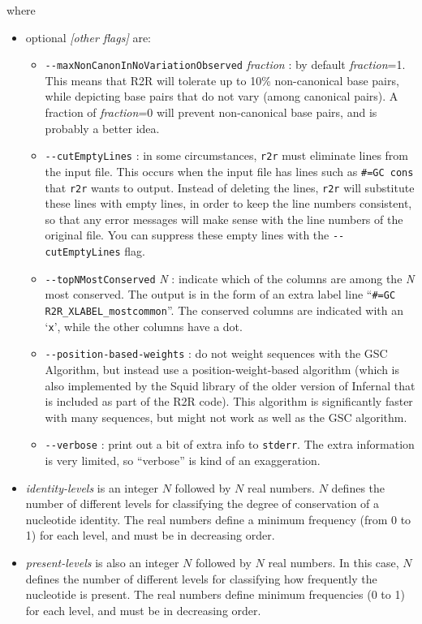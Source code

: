 \documentclass[letterpaper,12pt]{report}
\begin{document}
where
\begin{itemize}
\item optional {\it{} [other flags]} are:
  \begin{itemize}
  \item {\tt -{}-maxNonCanonInNoVariationObserved} {\it fraction} : by default {\it fraction}=1. This means that R2R will tolerate up to 10\% non-canonical base pairs, while depicting base pairs that do not vary (among canonical pairs).  A fraction of {\it fraction}=0 will prevent non-canonical base pairs, and is probably a better idea.
  \item {\tt -{}-cutEmptyLines} : in some circumstances, {\tt r2r} must eliminate lines from the input file.  This occurs when the input file has lines such as {\tt \#=GC cons} that {\tt r2r} wants to output.  Instead of deleting the lines, {\tt r2r} will substitute these lines with empty lines, in order to keep the line numbers consistent, so that any error messages will make sense with the line numbers of the original file.  You can suppress these empty lines with the {\tt -{}-cutEmptyLines} flag.
  \item {\tt -{}-topNMostConserved} {\it N} : indicate which of the columns are among the {\it N} most conserved.  The output is in the form of an extra label line ``{\tt \#=GC R2R\_XLABEL\_mostcommon}''.  The conserved columns are indicated with an `{\tt x}', while the other columns have a dot.
  \item {\tt -{}-position-based-weights} : do not weight sequences with the GSC Algorithm, but instead use a position-weight-based algorithm (which is also implemented by the Squid library of the older version of Infernal that is included as part of the R2R code).  This algorithm is significantly faster with many sequences, but might not work as well as the GSC algorithm.
  \item {\tt -{}-verbose} : print out a bit of extra info to {\tt stderr}.  The extra information is very limited, so ``verbose'' is kind of an exaggeration.
  \end{itemize}
\item {\it identity-levels} is an integer $N$ followed by $N$ real numbers.  $N$ defines the number of different levels for classifying the degree of conservation of a nucleotide identity.  The real numbers define a minimum frequency (from 0 to 1) for each level, and must be in decreasing order.
\item {\it present-levels} is also an integer $N$ followed by $N$ real numbers.  In this case, $N$ defines the number of different levels for classifying how frequently the nucleotide is present.  The real numbers define minimum frequencies (0 to 1) for each level, and must be in decreasing order.

\end{itemize}
\end{document}
